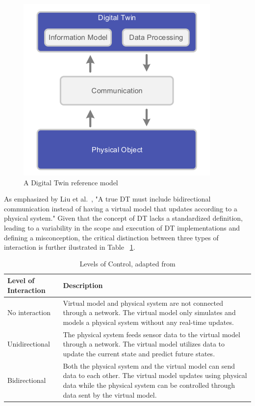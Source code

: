 \begin{figure}[h]
    \centering
    \includegraphics[width=0.4\linewidth]{figs/dt_reference_model.png}
    \caption{A Digital Twin reference model \cite{dt_model}}
    \label{f:dt-structure}
\end{figure}


As emphasized by Liu et al.~\cite{liu2022state}, "A true DT must include bidirectional communication instead of having a virtual model that updates
according to a physical system." 
Given that the concept of \ac{DT} lacks a standardized definition, leading to a variability in the scope and execution of \ac{DT} implementations and
defining a misconception, the critical distinction between three types of interaction is further ilustrated in Table
~\ref{tab:levels_of_control}.

\begin{table}[ht]
    \centering
    \caption{Levels of Control, adapted from \cite{liu2022state}}
    \label{tab:levels_of_control}
    \begin{tabular}{@{}l>{\raggedright\arraybackslash}p{10cm}@{}}
    \toprule
    Level of Interaction & Description \\ 
    \midrule
    No interaction & Virtual model and physical system are not connected through a network. The virtual model only simulates and models a physical 
    system without any real-time updates. \\ \hline
    Unidirectional & The physical system feeds sensor data to the virtual model through a network. The virtual model utilizes data to update the 
    current state and predict future states. \\ \hline
    Bidirectional & Both the physical system and the virtual model can send data to each other. The virtual model updates using physical data while 
    the physical system can be controlled through data sent by the virtual model. \\ 
    \bottomrule
    \end{tabular}
\end{table}


